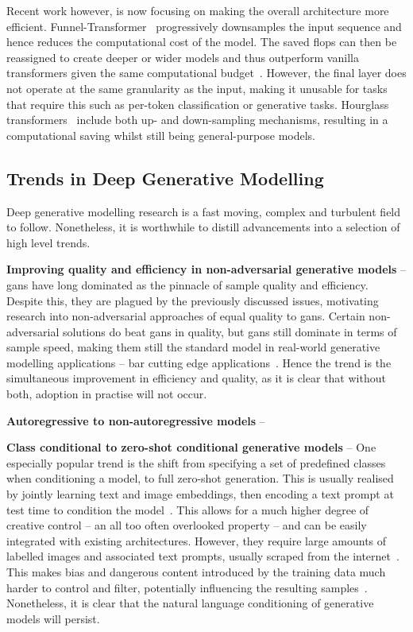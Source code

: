 Recent work however, is now focusing on making the overall architecture more
efficient. Funnel-Transformer~\cite{dai2020funneltransformer} progressively
downsamples the input sequence and hence reduces the computational cost of the
model. The saved \glspl{flop} can then be reassigned to create deeper or wider models
and thus outperform vanilla transformers given the same computational
budget~\cite{dai2020funneltransformer}. However, the final layer does not
operate at the same granularity as the input, making it unusable for tasks that
require this such as per-token classification or generative tasks. Hourglass
transformers~\cite{nawrot2021hierarchical} include both up- and down-sampling
mechanisms, resulting in a computational saving whilst still being
general-purpose models.

\subsection{Trends in Deep Generative Modelling}
\label{subsec:trends}

Deep generative modelling research is a fast moving, complex and turbulent field
to follow. Nonetheless, it is worthwhile to distill advancements into a
selection of high level trends.

\textbf{Improving quality and efficiency in non-adversarial generative models} -- 
\glspl{gan} have long dominated as the pinnacle of sample quality and
efficiency. Despite this, they are plagued by the previously discussed issues,
motivating research into non-adversarial approaches of equal quality to
\glspl{gan}. Certain non-adversarial solutions do beat \glspl{gan} in quality,
but \glspl{gan} still dominate in terms of sample speed, making them still the
standard model in real-world generative modelling applications -- bar cutting
edge applications~\cite{ramesh2021dalle,ramesh2022dalle2}. Hence the trend is
the simultaneous improvement in efficiency and quality, as it is clear that
without both, adoption in practise will not occur.

\textbf{Autoregressive to non-autoregressive models} -- 

\textbf{Class conditional to zero-shot conditional generative models} -- 
One especially popular trend is the shift from specifying a set of predefined
classes when conditioning a model, to full zero-shot generation. This is usually
realised by jointly learning text and image embeddings, then encoding a text
prompt at test time to condition the
model~\cite{ramesh2021dalle,ramesh2022dalle2,rombach2021highresolution,lee2022rqvae}.
This allows for a much higher degree of creative control -- an all too often
overlooked property -- and can be easily integrated with existing architectures.
However, they require large amounts of labelled images and associated text
prompts, usually scraped from the
internet~\cite{rombach2021highresolution,ramesh2021dalle,ramesh2022dalle2}. This
makes bias and dangerous content introduced by the training data much harder to
control and filter, potentially influencing the resulting
samples~\cite{mishkin2022risks}. Nonetheless, it is clear that the natural
language conditioning of generative models will persist.


